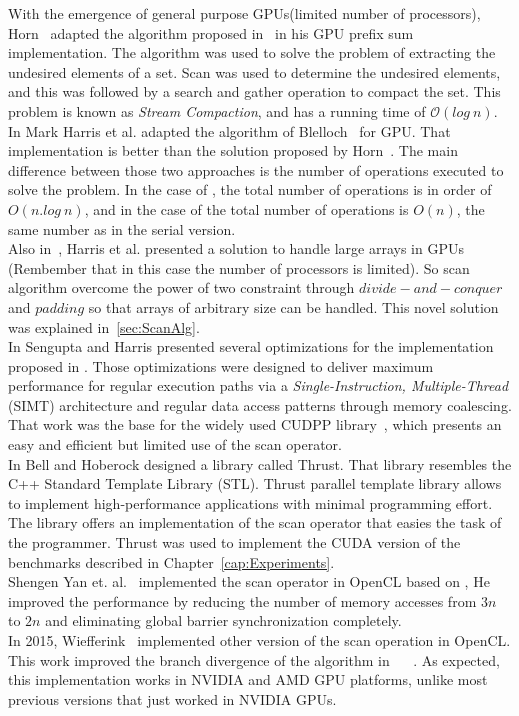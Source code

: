 \documentclass[Ingles]{ic-tese-v1}
\newcommand{\rcap}[1]{Chapter~\ref{cap:#1}}
\begin{document}
With the emergence of general purpose GPUs(limited number of processors), Horn~\cite{GPUGems2} adapted the algorithm proposed in~\cite{dataparallel} in his GPU prefix sum implementation. The algorithm was used  to solve the problem of extracting the undesired elements of a set. Scan  was used to determine  the undesired elements, and this was followed by a search and  gather   operation  to   compact the set.  This   problem  is   known  as \textit{Stream   Compaction},  and has a running  time   of $\mathcal{O}(log\ n)$.\\
In \cite{harris2007parallel} Mark Harris  et al. adapted the algorithm of Blelloch~\cite{ScanAsPrimitive} for GPU. That  implementation is better than
the solution  proposed by Horn~\cite{GPUGems2}. The  main difference
between those two approaches is the number of operations executed to
solve the problem. In the case of \cite{GPUGems2}, the total number of
operations is in order of $O(n.log\ n)$, and in the case of \cite{harris2007parallel}
the  total number  of operations  is $O(n)$,  the same  number as  in the
serial version.\\
Also in~\cite{harris2007parallel}, Harris et al. presented a solution  to
handle large arrays in GPUs (Rembember that in this case the number of processors is limited). So scan algorithm overcome the power of two constraint through $divide-and-conquer$ and $padding$ so that arrays of arbitrary size can be handled.
This novel solution was explained in~\ref{sec:ScanAlg}.\\
In   \cite{Sengupta:2008}  Sengupta and  Harris presented  several
optimizations     for      the     implementation      proposed     in
\cite{harris2007parallel}. Those  optimizations   were  designed  to
deliver  maximum  performance  for regular  execution  paths  via  a
\textit{Single-Instruction,  Multiple-Thread} (SIMT) architecture and
regular data access patterns through memory coalescing.  That work was
the  base  for  the  widely  used  CUDPP  library~\cite{CUDPP},  which
presents an easy and efficient but limited use of the scan operator.\\
In  \cite{Nathan:2011} Bell  and  Hoberock designed  a library  called
Thrust.   That library  resembles  the C++  Standard Template  Library
(STL).   Thrust  parallel   template  library   allows  to   implement
high-performance  applications with  minimal  programming effort.  The
library offers an implementation of the scan operator that easies the task of
the programmer.  Thrust  was used  to implement  the CUDA version of the
benchmarks described in \rcap{Experiments}.\\
Shengen Yan et.  al.~\cite{Yan:2013}  implemented the scan operator in
OpenCL based on \cite{harris2007parallel},  He improved the performance
by  reducing the  number  of memory  accesses from  $3n$  to $2n$  and
eliminating global barrier synchronization completely.\\
In 2015, Wiefferink~\cite{ScanOpenCL} implemented other version of the
scan operation in OpenCL.  This work improved the branch divergence of
the  algorithm in  ~\cite{ScanAsPrimitive} ~\cite{harris2007parallel}.
As  expected,  this  implementation  works   in  NVIDIA  and  AMD  GPU
platforms, unlike  most previous versions  that just worked  in NVIDIA
GPUs.
\end{document}
